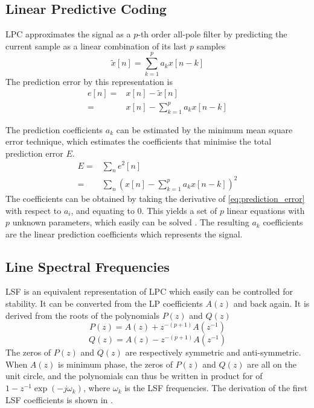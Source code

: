 \subsection{Linear Predictive Coding} %
\label{sub:lpc}
LPC approximates the signal as a $p$-th order all-pole filter by predicting the current sample as a linear combination of its last $p$ samples \cite{digsig}
\begin{equation}
	\tilde{x}[n] = \sum_{k=1}^{p}a_k x[n-k]
\end{equation}
The prediction error by this representation is 
\begin{equation}
	\begin{split}
		e[n]= & x[n]-\tilde{x}[n]\\
		= & x[n]-\sum_{k=1}^{p}a_k x[n-k]
	\end{split}
\end{equation}

The prediction coefficients $a_k$ can be estimated by the minimum mean square error technique, which estimates the coefficients that minimise the total prediction error $E$.
\begin{equation}
	\label{eq:prediction_error}
	\begin{split}
		E = & \sum_{n}e^2[n]\\
		= & \sum_{n}\left( x[n]-\sum_{k=1}^{p}a_k x[n-k] \right)^2
	\end{split}
\end{equation}
The coefficients can be obtained by taking the derivative of \eqref{eq:prediction_error} with respect to $a_i$, and equating to 0. This yields a set of $p$ linear equations with $p$ unknown parameters, which easily can be solved \cite{digsig}. The resulting $a_k$ coefficients are the linear prediction coefficients which represents the signal.

\subsection{Line Spectral Frequencies} %
\label{sub:line_spectral_frequencies}
LSF is an equivalent representation of LPC which easily can be controlled for stability. It can be converted from the LP coefficients $A(z)$ and back again. It is derived from the roots of the polynomials $P(z)$ and $Q(z)$ 
\begin{equation}
	\label{eq:p_z}
	P(z) = A(z)+z^{-(p+1)}A(z^{-1})
\end{equation}
\begin{equation}
	\label{eq:q_z}
	Q(z) = A(z)-z^{-(p+1)}A(z^{-1})
\end{equation}
The zeros of $P(z)$ and $Q(z)$ are respectively symmetric and anti-symmetric. When $A(z)$ is minimum phase, the zeros of $P(z)$ and $Q(z)$ are all on the unit circle, and the polynomials can thus be written in product for of
$1-z^{-1}\exp(-j\omega_k)$, where $\omega_k$ is the LSF frequencies. The derivation of the first LSF coefficients is shown in \cite[p. 304]{taletek}.

